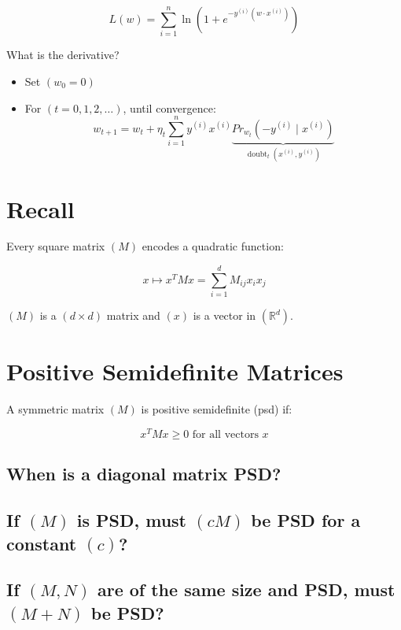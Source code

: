 \documentclass{article}
\begin{document}
\begin{equation}
L(w) = \sum_{i=1}^{n} \ln \left(1 + e^{-y^{(i)}\left(w \cdot x^{(i)}\right)}\right)
\end{equation}

What is the derivative?

\begin{itemize}
    \item Set $( w_{0} = 0 )$
    \item For $( t = 0, 1, 2, \ldots )$, until convergence:
    \begin{equation}
    w_{t+1} = w_{t} + \eta_{t} \sum_{i=1}^{n} y^{(i)} x^{(i)} \underbrace{P r_{w_{t}}\left(-y^{(i)} \mid x^{(i)}\right)}_{\operatorname{doubt}_{t}\left(x^{(i)}, y^{(i)}\right)}
    \end{equation}
\end{itemize}

\section*{Recall}
Every square matrix $( M )$ encodes a quadratic function:

\begin{equation}
x \longmapsto x^{T} M x = \sum_{i=1}^{d} M_{i j} x_{i} x_{j}
\end{equation}

$( M )$ is a $( d \times d )$ matrix and $( x )$ is a vector in $( \mathbb{R}^{d} )$.

\section*{Positive Semidefinite Matrices}
A symmetric matrix $( M )$ is positive semidefinite (psd) if:

\begin{equation}
x^{T} M x \geq 0 \text{ for all vectors } x
\end{equation}

\subsection*{When is a diagonal matrix PSD?}

\subsection*{If $( M )$ is PSD, must $( c M )$ be PSD for a constant $( c )$?}

\subsection*{If $( M, N )$ are of the same size and PSD, must $( M + N )$ be PSD?}
\end{document}
